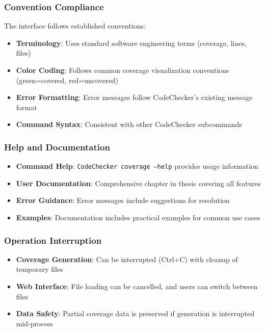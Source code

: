 \subsubsection{Convention Compliance}

The interface follows established conventions:

\begin{itemize}
    \item \textbf{Terminology}: Uses standard software engineering terms (coverage, lines, files)
    \item \textbf{Color Coding}: Follows common coverage visualization conventions (green=covered, red=uncovered)
    \item \textbf{Error Formatting}: Error messages follow CodeChecker's existing message format
    \item \textbf{Command Syntax}: Consistent with other CodeChecker subcommands
\end{itemize}

\subsubsection{Help and Documentation}

\begin{itemize}
    \item \textbf{Command Help}: \texttt{CodeChecker coverage --help} provides usage information
    \item \textbf{User Documentation}: Comprehensive chapter in thesis covering all features
    \item \textbf{Error Guidance}: Error messages include suggestions for resolution
    \item \textbf{Examples}: Documentation includes practical examples for common use cases
\end{itemize}

\subsubsection{Operation Interruption}

\begin{itemize}
    \item \textbf{Coverage Generation}: Can be interrupted (Ctrl+C) with cleanup of temporary files
    \item \textbf{Web Interface}: File loading can be cancelled, and users can switch between files
    \item \textbf{Data Safety}: Partial coverage data is preserved if generation is interrupted mid-process
\end{itemize}
